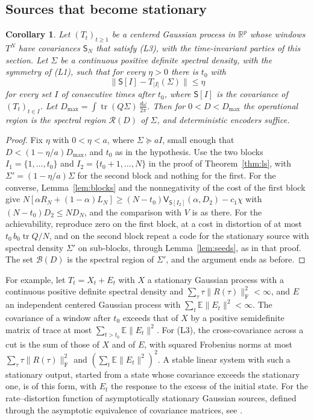 \documentclass[11pt,onecolumn]{IEEEtran}
\newtheorem{corollary}[theorem]{Corollary}
\newcommand{\E}{\mathbb{E}}
\newcommand{\R}{\mathbb{R}}
\newcommand{\tr}{\operatorname{tr}}
\newcommand{\dw}{\tfrac{d\omega}{2\pi}}
\newcommand{\fro}{\mathrm F}
\begin{document}
\subsection{Sources that become stationary}

\begin{corollary}\label{cor:as}
Let $(T_t)_{t\ge1}$ be a centered Gaussian process in $\R^p$ whose
windows $T^N$ have covariances $\mathsf S_N$ that satisfy (L3), with the
time-invariant parties of this section. Let $\Sigma$ be a continuous
positive definite spectral density, with the symmetry of (L1), such
that for every $\eta>0$ there is $t_0$ with
\[
\bigl\|\mathsf S[I]-T_{|I|}(\Sigma)\bigr\|\le\eta
\]
for every set $I$ of consecutive times after $t_0$, where
$\mathsf S[I]$ is the covariance of $(T_t)_{t\in I}$. Let
$D_{\max}=\int\tr(Q\Sigma)\,\dw$. Then for
$0<D<D_{\max}$ the operational region is the spectral region
$\mathcal R(D)$ of $\Sigma$, and deterministic encoders suffice.
\end{corollary}

\begin{proof}
Fix $\eta$ with $0<\eta<a$, where $\Sigma\succeq aI$, small enough
that $D<(1-\eta/a)D_{\max}$, and $t_0$ as in the hypothesis. Use the two blocks $I_1=\{1,\dots,t_0\}$ and
$I_2=\{t_0+1,\dots,N\}$ in the proof of Theorem~\ref{thm:ls}, with
$\Sigma'=(1-\eta/a)\Sigma$ for the second block and nothing for the
first. For the converse, Lemma~\ref{lem:blocks} and the nonnegativity
of the cost of the first block give
$N[\alpha R_N+(1-\alpha)L_N]\ge(N-t_0)\mathsf V_{\mathsf S[I_2]}(\alpha,D_2)-c_1\chi$
with $(N-t_0)D_2\le ND_N$, and the comparison with $V$ is as there.
For the achievability, reproduce zero on the first block, at a cost in
distortion of at most $t_0\,b_0\tr Q/N$, and on the second block
repeat a code for the stationary source with spectral density
$\Sigma'$ on sub-blocks, through Lemma~\ref{lem:seeds}, as in that
proof. The set $\mathcal B(D)$ is the spectral
region of $\Sigma'$, and the argument ends as before.
\end{proof}

For example, let $T_t=X_t+E_t$ with $X$ a stationary Gaussian process
with a continuous positive definite spectral density and
$\sum_\tau\tau\|R(\tau)\|_{\fro}^2<\infty$, and $E$ an independent centered
Gaussian process with $\sum_t\E\|E_t\|^2<\infty$. The covariance of a
window after $t_0$ exceeds that of $X$ by a positive semidefinite
matrix of trace at most $\sum_{t>t_0}\E\|E_t\|^2$. For (L3), the
cross-covariance across a cut is the sum of those of $X$ and of $E$,
with squared Frobenius norms at most
$\sum_\tau\tau\|R(\tau)\|_{\fro}^2$ and $(\sum_t\E\|E_t\|^2)^2$. A
stable linear system with such a stationary output, started from a
state whose covariance exceeds the stationary one, is of this form,
with $E_t$ the response to the excess of the initial state. For the rate--distortion function of
asymptotically stationary Gaussian sources, defined through the
asymptotic equivalence of covariance matrices, see
\cite{gutierrez2018}.
\end{document}

